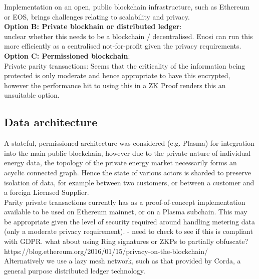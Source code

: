 \documentclass{article}
\theoremstyle{definition}
\theoremstyle{plain} %
\begin{document}
\noindent Implementation on an open, public blockchain infrastructure, such as Ethereum or EOS, brings challenges relating to scalability and privacy. \\

\textbf{Option B: Private blockhain or distributed ledger}: \\

\noindent unclear whether this needs to be a blockchain / decentralised. Enosi can run this more efficiently as a centralised not-for-profit given the privacy requirements. \\

\textbf{Option C: Permissioned blockchain}: \\

\noindent Private parity transactions: Seems that the criticality of the information being protected is only moderate and hence appropriate to have this encrypted, however the performance hit to using this in a ZK Proof renders this an unsuitable option.\\



\subsection{Data architecture}

A stateful, permissioned architecture was considered (e.g. Plasma) for integration into the main public blockchain, however due to the private nature of individual energy data, the topology of the private energy market necessarily forms an acyclic connected graph. Hence the state of various actors is sharded to preserve isolation of data, for example between two customers, or between a customer and a foreign Licensed Supplier.  \\

\noindent Parity private transactions currently has as a proof-of-concept implementation available to be used on Ethereum mainnet, or on a Plasma subchain. This may be appropriate given the level of security required around handling metering data (only a moderate privacy requirement). - need to check to see if this is compliant with GDPR. what about using Ring signatures or ZKPs to partially obfuscate? \\
https://blog.ethereum.org/2016/01/15/privacy-on-the-blockchain/\\

\noindent Alternatively we use a lazy mesh network, such as that provided by Corda, a general purpose distributed ledger technology. \\
\end{document}
